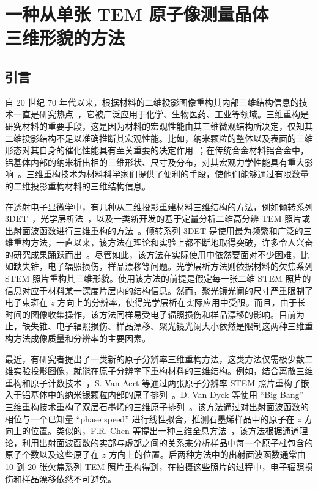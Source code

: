 
\clearemptydoublepage

\chapter[一种从单张 TEM 原子像测量晶体三维形貌的方法]{一种从单张 TEM 原子像测量晶体\\三维形貌的方法}

\section{引言}

自 20 世纪 70 年代以来，根据材料的二维投影图像重构其内部三维结构信息的技术一直是研究热点~\cite{DeRosier1968}，它被广泛应用于化学、生物医药、工业等领域。三维重构是研究材料的重要手段，这是因为材料的宏观性能由其三维微观结构所决定，仅知其二维投影结构不足以准确推断其宏观性能。比如，纳米颗粒的整体以及表面的三维形态对其自身的催化性能具有至关重要的决定作用~\cite{Jaramillo2007}；在传统合金材料铝合金中，铝基体内部的纳米析出相的三维形状、尺寸及分布，对其宏观力学性能具有重大影响~\cite{Chen2006,Yang2014,Malladi2014}。三维重构技术为材料科学家们提供了便利的手段，使他们能够通过有限数量的二维投影重构材料的三维结构信息。

在透射电子显微学中，有几种从二维投影重建材料三维结构的方法，例如倾转系列 3DET~\cite{Kubel2005,Xu2015,Scott2012,Miao2005,Mao2010,Lu2015}，光学层析法~\cite{Xin2009,Intaraprasonk2008,Xin2008,Borisevich2006,Yang2015,VandenBroek2010}，以及一类新开发的基于定量分析二维高分辨 TEM 照片或出射面波函数进行三维重构的方法~\cite{ChenFR2017,ChenFR2016,Jia2014,VanDyck2012,ChenFR2015,WangA2012,WangA2010}。倾转系列 3DET 是使用最为频繁和广泛的三维重构方法，一直以来，该方法在理论和实验上都不断地取得突破，许多令人兴奋的研究成果踊跃而出~\cite{Zhou2019,Xu2015,Scott2012,Lu2015}。尽管如此，该方法在实际使用中依然要面对不少困难，比如缺失锥，电子辐照损伤，样品漂移等问题。光学层析方法则依据材料的欠焦系列 STEM 照片重构其三维形貌。使用该方法的前提是假定每一张二维 STEM 照片的信息对应于材料某一深度片层内的结构信息。然而，聚光镜光阑的尺寸严重限制了电子束斑在 $z$ 方向上的分辨率，使得光学层析在实际应用中受限。而且，由于长时间的图像收集操作，该方法同样易受电子辐照损伤和样品漂移的影响。目前为止，缺失锥、电子辐照损伤、样品漂移、聚光镜光阑大小依然是限制这两种三维重构方法成像质量和分辨率的主要因素。

最近，有研究者提出了一类新的原子分辨率三维重构方法，这类方法仅需极少数二维实验投影图像，就能在原子分辨率下重构材料的三维结构。例如，结合离散三维重构和原子计数技术~\cite{Alania2017,Lefebvre2015}，S. Van Aert 等通过两张原子分辨率 STEM 照片重构了嵌入于铝基体中的纳米银颗粒内部的原子排列~\cite{VanAert2011}。D. Van Dyck 等使用 “Big Bang” 三维重构技术重构了双层石墨烯的三维原子排列~\cite{VanDyck2012}。该方法通过对出射面波函数的相位与一个已知量 “phase speed” 进行线性拟合，推测石墨烯样品中的原子在 $z$ 方向上的位置。类似的，F.R. Chen 等提出一种三维全息方法~\cite{ChenFR2017,ChenFR2016}，该方法根据通道理论，利用出射面波函数的实部与虚部之间的关系来分析样品中每一个原子柱包含的原子个数以及这些原子在 $z$ 方向上的位置。后两种方法中的出射面波函数通常由 10 到 20 张欠焦系列 TEM 照片重构得到，在拍摄这些照片的过程中，电子辐照损伤和样品漂移依然不可避免。

